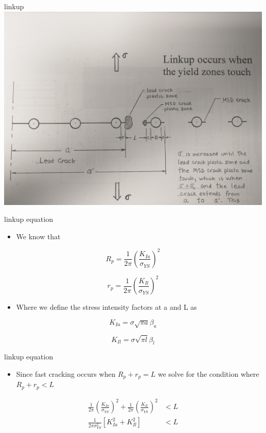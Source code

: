 \documentclass[
  letterpaper,
  ignorenonframetext,
  aspectratio=43,
  handout,
  12pt]{beamer}
\providecommand{\tightlist}{%
  \setlength{\itemsep}{0pt}\setlength{\parskip}{0pt}}
\providecommand{\tightlist}{%
\setlength{\itemsep}{0pt}\setlength{\parskip}{0pt}}
\let\Oldincludegraphics\includegraphics
\renewcommand{\includegraphics}[2][]{\Oldincludegraphics[width=\textwidth,height=0.7\textheight,keepaspectratio]{#2}}
\begin{document}
\begin{frame}{linkup}
\protect\hypertarget{linkup}{}
\includegraphics{../images/msd.jpg}
\end{frame}

\begin{frame}{linkup equation}
\protect\hypertarget{linkup-equation}{}
\begin{itemize}
\tightlist
\item
  We know that
\end{itemize}

\[R_p = \frac{1}{2\pi}\left(\frac{K_{Ia}}{\sigma_{YS}}\right)^2\]

\[r_p = \frac{1}{2\pi}\left(\frac{K_{Il}}{\sigma_{YS}}\right)^2\]

\begin{itemize}
\tightlist
\item
  Where we define the stress intensity factors at a and L as
\end{itemize}

\[K_{Ia} = \sigma \sqrt{\pi a} \beta_a\]

\[K_{Il} = \sigma \sqrt{\pi l} \beta_l\]
\end{frame}

\begin{frame}{linkup equation}
\protect\hypertarget{linkup-equation-1}{}
\begin{itemize}
\tightlist
\item
  Since fast cracking occurs when \(R_p + r_p = L\) we solve for the
  condition where \(R_p + r_p < L\)
\end{itemize}

\[\begin{align}
  \frac{1}{2\pi}\left(\frac{K_{Ia}}{\sigma_{YS}}\right)^2 + \frac{1}{2\pi}\left(\frac{K_{Il}}{\sigma_{YS}}\right)^2 & < L\\
  \frac{1}{2\pi\sigma_{YS}^2} \left[K_{Ia}^2 + K_{Il}^2\right] & < L
\end{align}\]
\end{frame}
\end{document}
